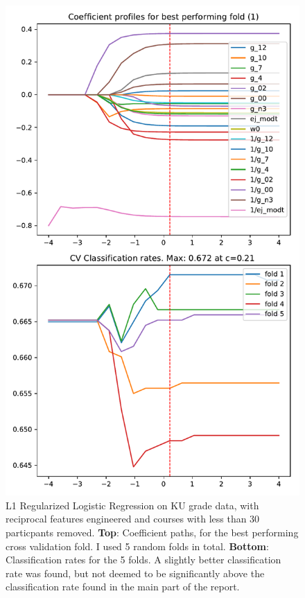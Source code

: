 \documentclass[%
 reprint,
 amsmath,amssymb,
 aps,
]{revtex4-1}
\begin{document}
\begin{figure}[H]
 \includegraphics[width=0.9\linewidth]{../figs/LogRegCV_KU_div_participants}
 \caption{L1 Regularized Logistic Regression on KU grade data, with reciprocal features engineered and courses with less than 30 particpants removed.
 \textbf{Top}: Coefficient paths, for the best performing cross validation fold.
 I used 5 random folds in total.
 \textbf{Bottom}: Classification rates for the 5 folds. A slightly better classification rate was found, but not deemed to be significantly above the classification rate found in the main part of the report.
 }
\end{figure}
\end{document}
